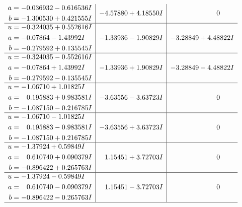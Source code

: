 \documentclass[1p]{elsarticle_modified}
\theoremstyle{definition}
\begin{document}
$$\begin{array}{c|c|c}
\begin{aligned}
a &= -0.036932 - 0.616536 I \\
b &= -1.300530 + 0.421555 I\end{aligned}
 & -4.57880 + 4.18550 I & \phantom{-0.000000 } 0 \\ \hline\begin{aligned}
u &= -0.324035 + 0.552616 I \\
a &= -0.07864 - 1.43992 I \\
b &= -0.279592 + 0.135545 I\end{aligned}
 & -1.33936 - 1.90829 I & -3.28849 + 4.48822 I \\ \hline\begin{aligned}
u &= -0.324035 - 0.552616 I \\
a &= -0.07864 + 1.43992 I \\
b &= -0.279592 - 0.135545 I\end{aligned}
 & -1.33936 + 1.90829 I & -3.28849 - 4.48822 I \\ \hline\begin{aligned}
u &= -1.06710 + 1.01825 I \\
a &= \phantom{-}0.195883 + 0.983581 I \\
b &= -1.087150 - 0.216785 I\end{aligned}
 & -3.63556 - 3.63723 I & \phantom{-0.000000 } 0 \\ \hline\begin{aligned}
u &= -1.06710 - 1.01825 I \\
a &= \phantom{-}0.195883 - 0.983581 I \\
b &= -1.087150 + 0.216785 I\end{aligned}
 & -3.63556 + 3.63723 I & \phantom{-0.000000 } 0 \\ \hline\begin{aligned}
u &= -1.37924 + 0.59849 I \\
a &= \phantom{-}0.610740 + 0.090379 I \\
b &= -0.896422 + 0.265763 I\end{aligned}
 & \phantom{-}1.15451 + 3.72703 I & \phantom{-0.000000 } 0 \\ \hline\begin{aligned}
u &= -1.37924 - 0.59849 I \\
a &= \phantom{-}0.610740 - 0.090379 I \\
b &= -0.896422 - 0.265763 I\end{aligned}
 & \phantom{-}1.15451 - 3.72703 I & \phantom{-0.000000 } 0\\
 \hline 
 \end{array}$$\newpage$$\begin{array}{c|c|c}  

\end{array}$$
\end{document}

